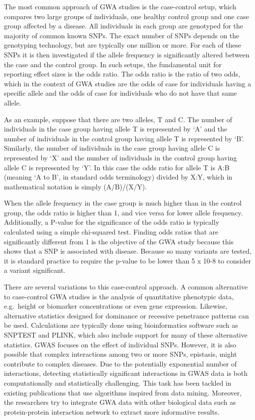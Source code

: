 The most common approach of GWA studies is the case-control setup, which compares two large groups of individuals, one healthy control group and one case group affected by a disease. All individuals in each group are genotyped for the majority of common known SNPs. The exact number of SNPs depends on the genotyping technology, but are typically one million or more. For each of these SNPs it is then investigated if the allele frequency is significantly altered between the case and the control group. In such setups, the fundamental unit for reporting effect sizes is the odds ratio. The odds ratio is the ratio of two odds, which in the context of GWA studies are the odds of case for individuals having a specific allele and the odds of case for individuals who do not have that same allele.

As an example, suppose that there are two alleles, T and C. The number of individuals in the case group having allele T is represented by `A' and the number of individuals in the control group having allele T is represented by `B'. Similarly, the number of individuals in the case group having allele C is represented by `X' and the number of individuals in the control group having allele C is represented by `Y'. In this case the odds ratio for allele T is A:B (meaning `A to B', in standard odds terminology) divided by X:Y, which in mathematical notation is simply (A/B)/(X/Y).

When the allele frequency in the case group is much higher than in the control group, the odds ratio is higher than 1, and vice versa for lower allele frequency. Additionally, a P-value for the significance of the odds ratio is typically calculated using a simple chi-squared test. Finding odds ratios that are significantly different from 1 is the objective of the GWA study because this shows that a SNP is associated with disease. Because so many variants are tested, it is standard practice to require the p-value to be lower than 5 x 10-8 to consider a variant significant.

There are several variations to this case-control approach. A common alternative to case-control GWA studies is the analysis of quantitative phenotypic data, e.g.~height or biomarker concentrations or even gene expression. Likewise, alternative statistics designed for dominance or recessive penetrance patterns can be used. Calculations are typically done using bioinformatics software such as SNPTEST and PLINK, which also include support for many of these alternative statistics. GWAS focuses on the effect of individual SNPs. However, it is also possible that complex interactions among two or more SNPs, epistasis, might contribute to complex diseases. Due to the potentially exponential number of interactions, detecting statistically significant interactions in GWAS data is both computationally and statistically challenging. This task has been tackled in existing publications that use algorithms inspired from data mining. Moreover, the researchers try to integrate GWA data with other biological data such as protein-protein interaction network to extract more informative results.

